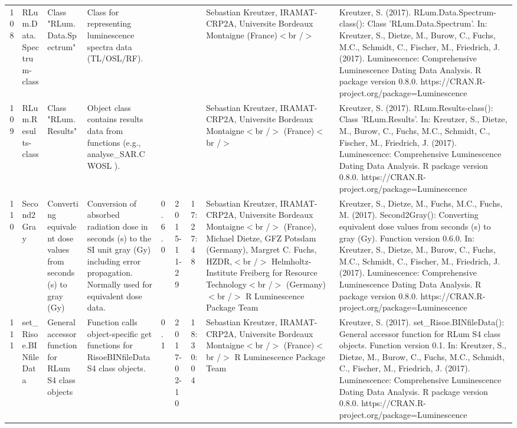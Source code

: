 \begin{table}[ht]
\begin{tabular}{rllllllll}
 \\ 
  108 & RLum.Data.Spectrum-class & Class  "RLum.Data.Spectrum" & Class for representing luminescence spectra data (TL/OSL/RF). &  &  &  & Sebastian Kreutzer, IRAMAT-CRP2A, Universite Bordeaux Montaigne (France)$<$br /$>$ & Kreutzer, S. (2017). RLum.Data.Spectrum-class(): Class 'RLum.Data.Spectrum'. In: Kreutzer, S., Dietze, M., Burow, C., Fuchs, M.C., Schmidt, C., Fischer, M., Friedrich, J. (2017). Luminescence: Comprehensive Luminescence Dating Data Analysis. R package version 0.8.0. https://CRAN.R-project.org/package=Luminescence
 \\ 
  109 & RLum.Results-class & Class  "RLum.Results" & Object class contains results data from functions (e.g.,  analyse\_SAR.CWOSL ). &  &  &  & Sebastian Kreutzer, IRAMAT-CRP2A, Universite Bordeaux Montaigne$<$br /$>$ (France)$<$br /$>$ & Kreutzer, S. (2017). RLum.Results-class(): Class 'RLum.Results'. In: Kreutzer, S., Dietze, M., Burow, C., Fuchs, M.C., Schmidt, C., Fischer, M., Friedrich, J. (2017). Luminescence: Comprehensive Luminescence Dating Data Analysis. R package version 0.8.0. https://CRAN.R-project.org/package=Luminescence
 \\ 
  110 & Second2Gray & Converting equivalent dose values from seconds (s) to gray (Gy) & Conversion of absorbed radiation dose in seconds (s) to the SI unit gray (Gy) including error propagation. Normally used for equivalent dose data. & 0.6.0 & 2015-11-29 & 17:27:48
 & Sebastian Kreutzer, IRAMAT-CRP2A, Universite Bordeaux Montaigne$<$br /$>$ (France),  Michael Dietze, GFZ Potsdam (Germany),  Margret C. Fuchs, HZDR,$<$br /$>$ Helmholtz-Institute Freiberg for Resource Technology$<$br /$>$ (Germany)$<$br /$>$  R Luminescence Package Team & Kreutzer, S., Dietze, M., Fuchs, M.C., Fuchs, M. (2017). Second2Gray(): Converting equivalent dose values from seconds (s) to gray (Gy). Function version 0.6.0. In: Kreutzer, S., Dietze, M., Burow, C., Fuchs, M.C., Schmidt, C., Fischer, M., Friedrich, J. (2017). Luminescence: Comprehensive Luminescence Dating Data Analysis. R package version 0.8.0. https://CRAN.R-project.org/package=Luminescence
 \\ 
  111 & set\_Risoe.BINfileData & General accessor function for RLum S4 class objects & Function calls object-specific get functions for RisoeBINfileData S4 class objects. & 0.1 & 2017-02-10 & 18:30:04
 & Sebastian Kreutzer, IRAMAT-CRP2A, Universite Bordeaux Montaigne$<$br /$>$ (France)$<$br /$>$  R Luminescence Package Team & Kreutzer, S. (2017). set\_Risoe.BINfileData(): General accessor function for RLum S4 class objects. Function version 0.1. In: Kreutzer, S., Dietze, M., Burow, C., Fuchs, M.C., Schmidt, C., Fischer, M., Friedrich, J. (2017). Luminescence: Comprehensive Luminescence Dating Data Analysis. R package version 0.8.0. https://CRAN.R-project.org/package=Luminescence

\end{tabular}
\end{table}
